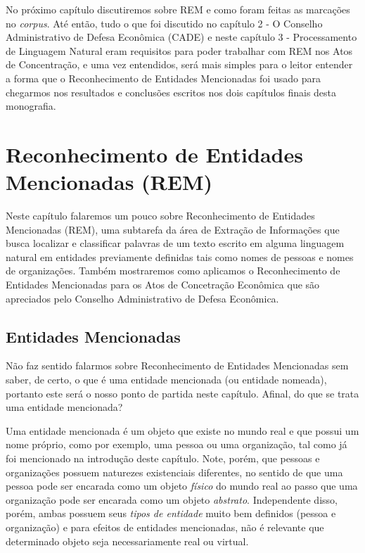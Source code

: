 \documentclass[11pt]{report}
\begin{document}
No próximo capítulo discutiremos sobre REM e como foram feitas as marcações no \textit{corpus}. Até então, tudo o que foi discutido no capítulo 2 - O Conselho Administrativo de Defesa Econômica (CADE) e neste capítulo 3 - Processamento de Linguagem Natural eram
requisitos para poder trabalhar com REM nos Atos de Concentração, e uma vez entendidos, será mais simples para o leitor entender a forma que o Reconhecimento de Entidades
Mencionadas foi usado para chegarmos nos resultados e conclusões escritos nos dois capítulos finais desta monografia.

\pagebreak
\chapter{Reconhecimento de Entidades Mencionadas (REM)}

\indent\indent Neste capítulo falaremos um pouco sobre Reconhecimento de Entidades Mencionadas (REM), uma subtarefa da área de Extração de Informações que busca localizar e classificar
palavras de um texto escrito em alguma linguagem natural em entidades previamente definidas tais como nomes de pessoas e nomes de organizações. Também mostraremos como
aplicamos o Reconhecimento de Entidades Mencionadas para os Atos de Concetração Econômica que são apreciados pelo Conselho Administrativo de Defesa Econômica.

\section{Entidades Mencionadas}

\indent\indent Não faz sentido falarmos sobre Reconhecimento de Entidades Mencionadas sem saber, de certo, o que é uma entidade mencionada (ou entidade nomeada), portanto este
será o nosso ponto de partida neste capítulo. Afinal, do que se trata uma entidade mencionada?

Uma entidade mencionada é um objeto que existe no mundo real e que possui um nome próprio, como por exemplo, uma pessoa ou uma organização, tal como já foi mencionado na introdução
deste capítulo. Note, porém, que pessoas e organizações possuem naturezes existenciais diferentes, no sentido de que uma pessoa pode ser encarada como um objeto \textit{físico} do mundo real
ao passo que uma organização pode ser encarada como um objeto \textit{abstrato}. Independente disso, porém, ambas possuem seus \textit{tipos de entidade} muito bem definidos
(pessoa e organização) e para efeitos de entidades mencionadas, não é relevante que determinado objeto seja necessariamente real ou virtual.
\end{document}

